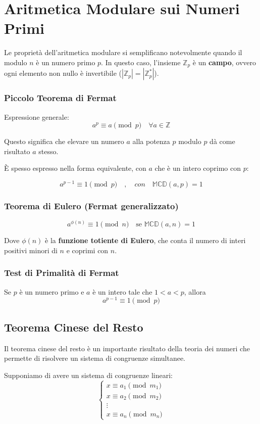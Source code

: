 \documentclass[a4paper,12pt]{report}
\begin{document}
\section{Aritmetica Modulare sui Numeri Primi}

Le proprietà dell'aritmetica modulare si semplificano notevolmente quando il modulo $n$ è un numero primo $p$. In questo caso, l'insieme $\mathbb{Z}_p$ è un \textbf{campo}, ovvero ogni elemento non nullo è invertibile (\( |\mathbb{Z}_p| =|\mathbb{Z}_p^*| \)).

\subsubsection*{Piccolo Teorema di Fermat}
Espressione generale:
$$a^p \equiv a \pmod{p} \quad \forall a \in \mathbb{Z}$$

Questo significa che elevare un numero $a$ alla potenza $p$ modulo $p$ dà come risultato $a$ stesso.

È spesso espresso nella forma equivalente, con \(a\) che è un intero coprimo con \(p\):

\[a^{p-1} \equiv 1 \pmod{p}\quad,\quad con\quad \mathbb{MCD}(a,p)=1\]

\subsubsection*{Teorema di Eulero (Fermat generalizzato)}

$$a^{\phi(n)} \equiv 1 \pmod{n} \quad \text{se } \mathbb{MCD}(a,n) = 1$$

Dove $\phi(n)$ è la \textbf{funzione totiente di Eulero}, che conta il numero di interi positivi minori di $n$ e coprimi con $n$.

\subsubsection*{Test di Primalità di Fermat} \label{sec:fermat}
Se $p$ è un numero primo e $a$ è un intero tale che $1 < a < p$, allora
\[a^{p-1} \equiv 1 \pmod{p}\]

\subsection*{Teorema Cinese del Resto} \label{sec:cinese}
Il teorema cinese del resto è un importante risultato della teoria dei numeri che permette di risolvere un sistema di congruenze simultanee. 

Supponiamo di avere un sistema di congruenze lineari:
\[\begin{cases}
x \equiv a_1 \pmod{m_1} \\
x \equiv a_2 \pmod{m_2} \\
\vdots \\
x \equiv a_n \pmod{m_n}
\end{cases}\]
\end{document}

